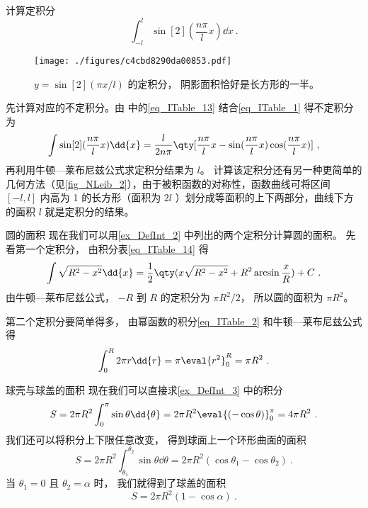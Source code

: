 \begin{example}{计算定积分}
\begin{equation}
\int_{-l}^l \sin[2](\frac{n\pi}{l} x) \dd{x}~.
\end{equation}

\begin{figure}[ht]
\centering
\texttt{[image: ./figures/c4cbd8290da00853.pdf]}
\caption{$y = \sin[2](\pi x/l)$ 的定积分， 阴影面积恰好是长方形的一半。}\label{fig_NLeib_2}
\end{figure}

先计算对应的不定积分。由 中的\autoref{eq_ITable_13}  结合\autoref{eq_ITable_1} 得不定积分为
\begin{equation}
\int\sin[2](\frac{n\pi}{l} x) \dd{x} = \frac{l}{2n\pi} \qty[\frac{n\pi}{l} x - \sin(\frac{n\pi}{l} x)\cos(\frac{n\pi}{l} x)]~,
\end{equation}
再利用牛顿—莱布尼兹公式求定积分结果为 $l$。 计算该定积分还有另一种更简单的几何方法（见\autoref{fig_NLeib_2}），由于被积函数的对称性，函数曲线可将区间 $[-l,l]$ 内高为 1 的长方形（面积为 $2l$ ）划分成等面积的上下两部分，曲线下方的面积 $l$ 就是定积分的结果。
\end{example}

\begin{example}{圆的面积}\label{ex_NLeib_2}
现在我们可以用\autoref{ex_DefInt_2}  中列出的两个定积分计算圆的面积。 先看第一个定积分， 由积分表\autoref{eq_ITable_14}  得
\begin{equation}
\int \sqrt{R^2 - x^2} \dd{x} = \frac12 \qty(x\sqrt{R^2 - x^2} + R^2\arcsin\frac{x}{R}) + C~.
\end{equation}
由牛顿—莱布尼兹公式， $-R$ 到 $R$ 的定积分为 $\pi R^2/2$， 所以圆的面积为 $\pi R^2$。

第二个定积分要简单得多， 由幂函数的积分\autoref{eq_ITable_2}  和牛顿—莱布尼兹公式得
\begin{equation}
\int_0^R 2\pi r \dd{r} = \pi \eval{r^2}_0^R = \pi R^2~.
\end{equation}
\end{example}

\begin{example}{球壳与球盖的面积}\label{ex_NLeib_3}
现在我们可以直接求\autoref{ex_DefInt_3}  中的积分
\begin{equation}
S = 2\pi R^2 \int_0^{\pi} \sin\theta \dd{\theta} = 2\pi R^2 \eval{(-\cos\theta)}_0^\pi = 4\pi R^2~.
\end{equation}
我们还可以将积分上下限任意改变， 得到球面上一个环形曲面的面积
\begin{equation}
S = 2\pi R^2 \int_{\theta_1}^{\theta_2} \sin\theta \dd{\theta} = 2\pi R^2 (\cos{\theta_1} - \cos{\theta_2})~.
\end{equation}
当 $\theta_1 = 0$ 且 $\theta_2 = \alpha$ 时， 我们就得到了球盖的面积
\begin{equation}
S = 2\pi R^2 (1 - \cos\alpha)~.
\end{equation}
\end{example}

